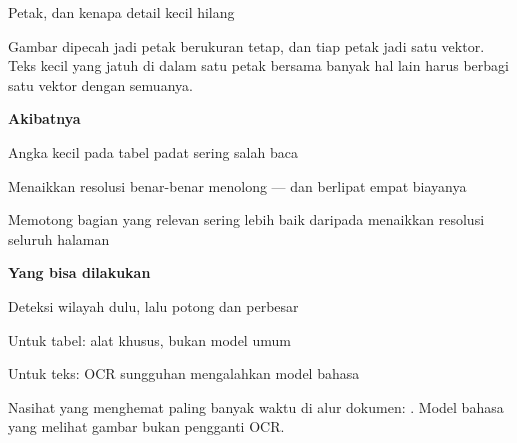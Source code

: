 \documentclass[aspectratio=169,11pt,t]{beamer}
\begin{document}
\begin{frame}[shrink=25]{Petak, dan kenapa detail kecil hilang}
{\fontsize{9.4}{12.6}\selectfont\color{fg2}Gambar dipecah jadi petak berukuran tetap, dan tiap petak jadi satu vektor. Teks kecil yang jatuh di dalam satu petak bersama banyak hal lain harus berbagi satu vektor dengan semuanya.\par}\vskip 4pt
\begin{minipage}[t]{0.485\textwidth}
{\fontsize{9.4}{12.6}\selectfont\color{fg2}\textbf{Akibatnya}\par}\vskip 4pt
\begin{ibullets}
\item Angka kecil pada tabel padat sering salah baca
\item Menaikkan resolusi benar-benar menolong --- dan berlipat empat biayanya
\item Memotong bagian yang relevan sering lebih baik daripada menaikkan resolusi seluruh halaman
\end{ibullets}

\end{minipage}%
\hfill
\begin{minipage}[t]{0.485\textwidth}
{\fontsize{9.4}{12.6}\selectfont\color{fg2}\textbf{Yang bisa dilakukan}\par}\vskip 4pt
\begin{ibullets}
\item Deteksi wilayah dulu, lalu potong dan perbesar
\item Untuk tabel: alat khusus, bukan model umum
\item Untuk teks: OCR sungguhan mengalahkan model bahasa
\end{ibullets}

\end{minipage}%
\begin{iband}[signal]
Nasihat yang menghemat paling banyak waktu di alur dokumen: . Model bahasa yang melihat gambar bukan pengganti OCR.
\end{iband}
\end{frame}
\end{document}
